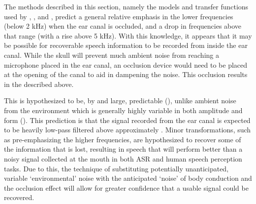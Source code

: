 


The methods described in this section, namely the models and transfer functions used by \cite{hansen:97b}, \cite{stenfelt:07}, and \cite{reinfeldt:10}, predict a general relative emphasis in the lower frequencies (below 2 kHz) when the ear canal is occluded, and a drop in frequencies above that range (with a rise above 5 kHz).  With this knowledge, it appears that it may be possible for recoverable speech information to be recorded from inside the ear canal.  While the skull will prevent much ambient noise from reaching a microphone placed in the ear canal, an occlusion device would need to be placed at the opening of the canal to aid in dampening the noise.  This occlusion results in the \DIFdelbegin {}\DIFdelend \DIFaddbegin {}\DIFaddend described above.

This \DIFdelbegin {}\DIFdelend \DIFaddbegin {}\DIFaddend is hypothesized to be, by and large, predictable (\cite{hansen:97b,reinfeldt:10}), unlike ambient noise from the environment which is generally highly variable in both amplitude and form (\cite{zhang:17}). This prediction is that the signal recorded from the ear canal is expected to be heavily low-pass filtered above approximately \DIFdelbegin {}\DIFdelend \DIFaddbegin {}\DIFaddend .  Minor transformations, such as pre-emphasizing the higher frequencies, are hypothesized to recover some of the information that is lost, resulting in speech that will perform better than a noisy signal collected at the mouth in both ASR and human speech perception tasks.
Due to this, the technique of substituting potentially unanticipated, variable `environmental' noise with the anticipated `noise' of body conduction and the occlusion effect will allow for greater confidence that a usable signal could be recovered. 

